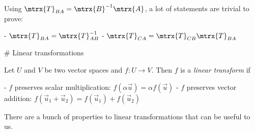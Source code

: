 Using $\mtrx{T}_{BA} = \mtrx{B}^{-1}\mtrx{A}$, a lot of statements are trivial to prove:

    - $\mtrx{T}_{BA} = \mtrx{T}_{AB}^{-1}$
    - $\mtrx{T}_{CA} = \mtrx{T}_{CB} \mtrx{T}_{BA}$














# Linear transformations

\begin{definition}
Let $U$ and $V$ be two vector spaces and $f:U \to V$. Then $f$ is a \emph{linear transform} if

    - $f$ preserves scalar multiplication: $f(\alpha \vec{u}) = \alpha f(\vec{u})$
    - $f$ preserves vector addition: $f(\vec{u}_1 + \vec{u}_2) = f(\vec{u}_1) + f(\vec{u}_2)$

\end{definition}

There are a bunch of properties to linear transformations that can be useful to us. 

